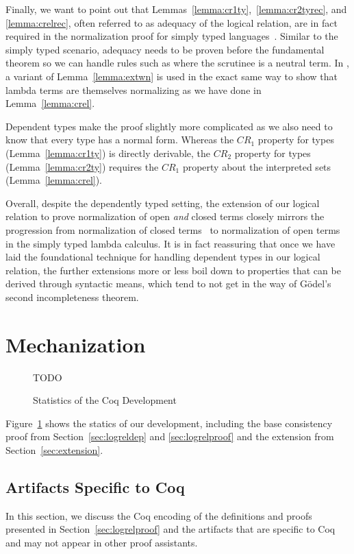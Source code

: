 \documentclass[acmsmall]{acmart}
\begin{document}
Finally, we want to point out that
Lemmas~\ref{lemma:cr1ty},~\ref{lemma:cr2tyrec}, and
\ref{lemma:crelrec}, often referred to as adequacy of the logical
relation, are in fact required in the normalization proof for simply
typed languages~\citep{abel2019poplmark}. Similar to the simply typed
scenario, adequacy needs to be proven before the fundamental theorem
so we can handle rules such as  where the scrutinee is a
neutral term. In \citet{abel2019poplmark}, a variant of
Lemma~\ref{lemma:extwn} is used in the exact same way to show that
lambda terms are themselves normalizing as we have done in
Lemma~\ref{lemma:crel}.

Dependent types make the proof slightly more complicated
as we also need to know that every type has a normal form. Whereas the
$CR_1$ property for types (Lemma~\ref{lemma:cr1ty}) is directly
derivable, the $CR_2$ property for types (Lemma~\ref{lemma:cr2ty})
requires the $CR_1$ property about the interpreted sets
(Lemma~\ref{lemma:crel}).

Overall, despite the dependently typed setting,
the extension of our logical relation to prove normalization of open
\emph{and} closed terms closely mirrors the progression from
normalization of closed terms~\citep{harpertait} to normalization of
open terms~\citep{harperkripke} in the simply typed lambda calculus.
It is in fact reassuring that once we have laid the foundational
technique for handling dependent types in our logical relation, the
further extensions more or less boil down to properties that can be
derived through syntactic means, which tend to not get in the way of
Gödel's second incompleteness theorem.

\section{Mechanization}
\label{sec:logrelmech}
\begin{figure}[h]
  TODO
  \caption{Statistics of the Coq Development}
  \label{fig:linecount}
\end{figure}


Figure~\ref{fig:linecount} shows the statics of our
development, including the base consistency proof from
Section~\ref{sec:logreldep} and \ref{sec:logrelproof} and the
extension from Section~\ref{sec:extension}.

\subsection{Artifacts Specific to Coq}
In this section, we discuss the Coq encoding of the definitions and proofs presented
in Section~\ref{sec:logrelproof}  and the artifacts that are
specific to Coq and may not appear in other proof assistants.
\end{document}
